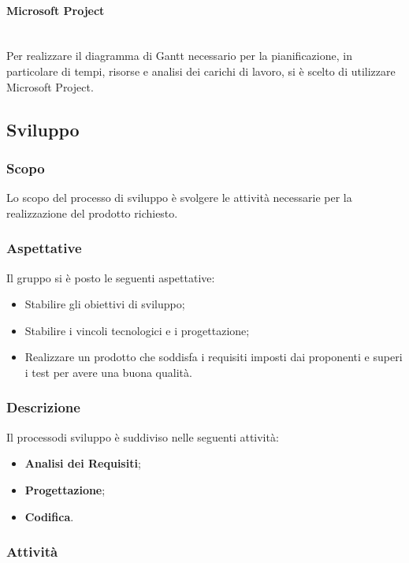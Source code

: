 \paragraph{Microsoft Project}\mbox{}\\ [1mm]
Per realizzare il diagramma di Gantt necessario per la pianificazione, in particolare di tempi, risorse e analisi dei carichi di lavoro, si è scelto di utilizzare Microsoft Project.

\subsection{Sviluppo}
\subsubsection{Scopo}
Lo scopo del processo di sviluppo è svolgere le attività necessarie per la realizzazione del prodotto richiesto.
\subsubsection{Aspettative}
Il gruppo si è posto le seguenti aspettative:
\begin{itemize}
	\item Stabilire gli obiettivi di sviluppo;
	\item Stabilire i vincoli tecnologici e i progettazione;
	\item Realizzare un prodotto che soddisfa i requisiti imposti dai proponenti e superi i test per avere una buona qualità.
\end{itemize}
\subsubsection{Descrizione}
Il processo\glosp di sviluppo è suddiviso nelle seguenti attività:
\begin{itemize}
	\item \textbf{Analisi dei Requisiti};
	\item \textbf{Progettazione};
	\item \textbf{Codifica}.
\end{itemize}
\subsubsection{Attività}
